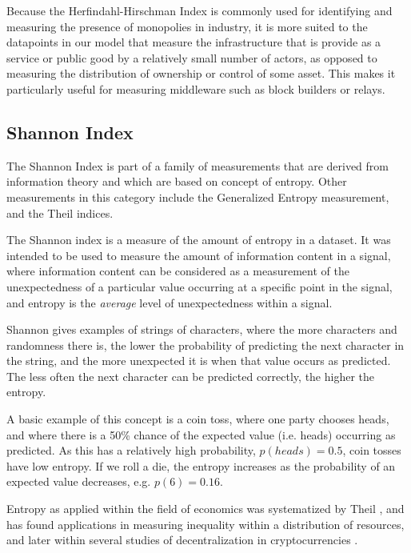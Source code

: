 \documentclass[conference]{IEEEtran}
\begin{document}
Because the Herfindahl-Hirschman Index is commonly used for identifying and measuring the presence of monopolies in industry, it is more suited to the datapoints in our model that measure the infrastructure that is provide as a service or public good by a relatively small number of actors, as opposed to measuring the distribution of ownership or control of some asset.  This makes it particularly useful for measuring middleware such as block builders or relays.

\subsection{Shannon Index}

The Shannon Index \cite{shannon1998mathematical} is part of a family of measurements that are derived from information theory and which are based on concept of entropy.  Other measurements in this category include the Generalized Entropy measurement, and the Theil indices.

The Shannon index is a measure of the amount of entropy in a dataset.  It was intended to be used to measure the amount of information content in a signal, where information content can be considered as a measurement of the unexpectedness of a particular value occurring at a specific point in the signal, and entropy is the \textit{average} level of unexpectedness within a signal.  

Shannon gives examples of strings of characters, where the more characters and randomness there is, the lower the probability of predicting the next character in the string, and the more unexpected it is when that value occurs as predicted.  The less often the next character can be predicted correctly, the higher the entropy.

A basic example of this concept is a coin toss, where one party chooses heads, and where there is a 50\% chance of the expected value (i.e. heads) occurring as predicted.  As this has a relatively high probability, $p(heads) = 0.5$, coin tosses have low entropy. If we roll a die, the entropy increases as the probability of an expected value decreases, e.g. $p(6) = 0.16$.

Entropy as applied within the field of economics was systematized by Theil \cite{theil1967economics}, and has found applications in measuring inequality within a distribution of resources, and later within several studies of decentralization in cryptocurrencies \cite{zhang2022sok, gochhayat2020measuring, kusmierz2022centralized}.
\end{document}
